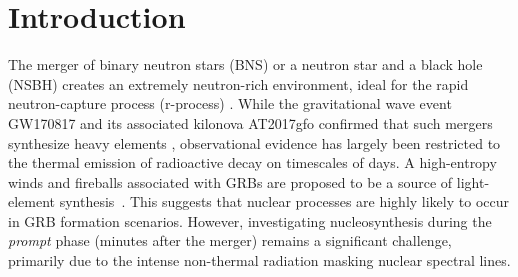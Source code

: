 \documentclass[linenumbers,twocolumn]{aastex631}
\begin{document}
\section{Introduction} \label{sec:intro}

The merger of binary neutron stars (BNS) or a neutron star and a black hole (NSBH) creates an extremely neutron-rich environment, ideal for the rapid neutron-capture process (r-process) \citep[e.g.,][]{1974ApJ...192L.145L, 1989Natur.340..126E,2018ApJ...869..130R,2019LRR....23....1M,2020ApJ...903L...3W,2024Natur.626..737L}. While the gravitational wave event GW170817 and its associated kilonova AT2017gfo confirmed that such mergers synthesize heavy elements \citep{2017PhRvL.119p1101A, 2019LRR....23....1M}, observational evidence has largely been restricted to the thermal emission of radioactive decay on timescales of days. A high-entropy winds and fireballs associated with GRBs are proposed to be a source of light-element synthesis~\citep[e.g.][]{1967ARA&A...5..525F,2001ApJ...561..957P,2000ApJ...533..424O,2001ApJ...562..887T,2002ApJ...580..368P}. This suggests that nuclear processes are highly likely to occur in GRB formation scenarios.  %
However, investigating nucleosynthesis during the \textit{prompt} phase (minutes after the merger) remains a significant challenge, primarily due to the intense non-thermal radiation masking nuclear spectral lines.



\end{document}
